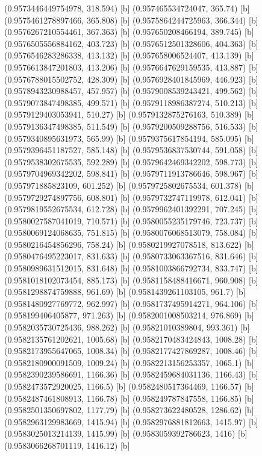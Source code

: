 {{{(0.9573446449754978, 318.594) [b] 
(0.957465534724047, 365.74) [b] 
(0.9575461278897466, 365.808) [b] 
(0.9575864244725963, 366.344) [b] 
(0.9576267210554461, 367.363) [b] 
(0.957650208466194, 389.745) [b] 
(0.9576505556884162, 403.723) [b] 
(0.9576512501328606, 404.363) [b] 
(0.9576546283286338, 413.132) [b] 
(0.957658006524407, 413.139) [b] 
(0.9576613847201803, 413.206) [b] 
(0.9576647629159535, 413.887) [b] 
(0.9576788015502752, 428.309) [b] 
(0.9576928401845969, 446.923) [b] 
(0.9578943230988457, 457.957) [b] 
(0.9579008539243421, 499.562) [b] 
(0.9579073847498385, 499.571) [b] 
(0.9579118986387274, 510.213) [b] 
(0.9579129403053941, 510.27) [b] 
(0.9579132875276163, 510.389) [b] 
(0.9579136347498385, 511.549) [b] 
(0.9579200509288756, 516.533) [b] 
(0.9579340895631973, 565.99) [b] 
(0.9579375617854194, 585.095) [b] 
(0.9579396451187527, 585.148) [b] 
(0.9579536837530744, 591.058) [b] 
(0.9579538302675535, 592.289) [b] 
(0.9579642469342202, 598.773) [b] 
(0.9579704969342202, 598.841) [b] 
(0.9579711913786646, 598.967) [b] 
(0.957971885823109, 601.252) [b] 
(0.9579725802675534, 601.378) [b] 
(0.9579729274897756, 608.801) [b] 
(0.9579732747119978, 612.041) [b] 
(0.9579819552675534, 612.728) [b] 
(0.9579962401392291, 707.245) [b] 
(0.9580027587041019, 710.571) [b] 
(0.9580055235179746, 723.737) [b] 
(0.9580069124068635, 751.815) [b] 
(0.9580076068513079, 758.084) [b] 
(0.9580216454856296, 758.24) [b] 
(0.9580219927078518, 813.622) [b] 
(0.9580476495223017, 831.633) [b] 
(0.9580733063367516, 831.646) [b] 
(0.9580989631512015, 831.648) [b] 
(0.9581003866792734, 833.747) [b] 
(0.9581018102073454, 885.173) [b] 
(0.9581158488416671, 960.908) [b] 
(0.9581298874759888, 961.69) [b] 
(0.9581439261103105, 961.7) [b] 
(0.9581480927769772, 962.997) [b] 
(0.9581737495914271, 964.106) [b] 
(0.958199406405877, 971.263) [b] 
(0.9582001008503214, 976.869) [b] 
(0.9582035730725436, 988.262) [b] 
(0.95821010389804, 993.361) [b] 
(0.9582135761202621, 1005.68) [b] 
(0.9582170483424843, 1008.28) [b] 
(0.9582173955647065, 1008.34) [b] 
(0.9582177427869287, 1008.46) [b] 
(0.9582180900091509, 1009.24) [b] 
(0.9582213156253357, 1065.1) [b] 
(0.9582390239586691, 1166.36) [b] 
(0.9582459684031136, 1166.43) [b] 
(0.9582473572920025, 1166.5) [b] 
(0.9582480517364469, 1166.57) [b] 
(0.9582487461808913, 1166.78) [b] 
(0.958249787847558, 1166.85) [b] 
(0.9582501350697802, 1177.79) [b] 
(0.958273622480528, 1286.62) [b] 
(0.9582963129983669, 1415.94) [b] 
(0.9582976881812663, 1415.97) [b] 
(0.9583025013214139, 1415.99) [b] 
(0.9583059392786623, 1416) [b] 
(0.9583066268701119, 1416.12) [b] 
}}}
